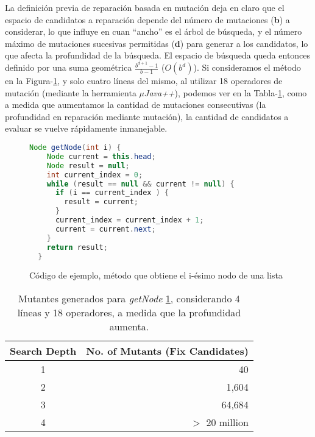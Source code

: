 La definici\'on previa de reparaci\'on basada en mutaci\'on deja en claro que el espacio de candidatos a reparaci\'on depende del n\'umero de mutaciones (\textbf{b}) a considerar, lo que influye en cuan ``ancho'' es el \'arbol de b\'usqueda, y el n\'umero m\'aximo de mutaciones sucesivas permitidas (\textbf{d}) para generar a los candidatos, lo que afecta la profundidad de la b\'usqueda. El espacio de b\'usqueda queda entonces definido por una suma geom\'etrica $\frac{b^{d+1}-1}{b-1}$ ($O(b^d)$). Si consideramos el m\'etodo en la Figura-\ref{figures.examples.repair.getNode}, y solo cuatro l\'ineas del mismo, al utilizar 18 operadores de mutaci\'on (mediante la herramienta \emph{$\mu$Java++}), podemos ver en la Tabla-\ref{tables.repair.mutation.explosion}, como a medida que aumentamos la cantidad de mutaciones consecutivas (la profundidad en reparaci\'on mediante mutaci\'on), la cantidad de candidatos a evaluar se vuelve r\'apidamente inmanejable.

\begin{figure}
	\begin{lstlisting}[mathescape=true,language=Java]
  Node getNode(int i) {
    Node current = this.head;
    Node result = null;
    int current_index = 0;
    while (result == null && current != null) {
      if (i == current_index ) {
        result = current;
      }
      current_index = current_index + 1;
      current = current.next;
    }
    return result;
  }
	\end{lstlisting}
	\caption{C\'odigo de ejemplo, m\'etodo que obtiene el i-\'esimo nodo de una lista}
	\label{figures.examples.repair.getNode}
\end{figure}

\begin{table}[t]
	\begin{center}
		\small
		\begin{tabular}{c r}
			Search Depth                            &	No. of Mutants (Fix Candidates)        \\
			\hline
			1 					&	40		                               	\\
			2 					&	1,604			                \\
			3 					&	64,684		        	        \\
			4 					&	$>$ 20 million		                
		\end{tabular}
		\normalsize
	\end{center}
	\caption{Mutantes generados para \emph{getNode} \ref{figures.examples.repair.getNode}, considerando 4 l\'ineas y 18 operadores, a medida que la profundidad aumenta.}
	\label{tables.repair.mutation.explosion}
\end{table}


